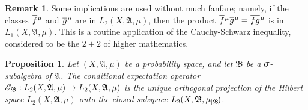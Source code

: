 \documentclass[
twoside=true,
paper=letter,
fontsize=11pt,
pagesize=auto,
leqno,
openany,
headsepline,
overfullrule,
]{scrbook}
\theoremstyle{plain}
\theoremstyle{plain}
\newtheorem{prop}[thm]{Proposition}
\theoremstyle{definition}
\newtheorem{rmk}[thm]{Remark}
\theoremstyle{bfnoteitalic}
\theoremstyle{bfnoteroman}
\newcommand{\sigalg}[1]{\mathfrak{#1}}
\newcommand{\cali}[1]{\mathscr{#1}}
\newcommand{\condexpop}[1]{\mathop{\cali{E}\hspace{-1pt}}\nolimits_{#1}}
\newcommand{\textsigma}{\hbox{\large{$\sigma$}}\kern-1pt}
\newcommand{\restrictedto}[1]{_{\lvert#1}\kern-1.5pt}
\newcommand{\sigmaalgebra}{\sigalg{A}}
\newcommand{\sigmaalgebraii}{\sigalg{B}}
\newcommand{\function}{f}
\newcommand{\functionii}{g}
\newcommand{\measurespace}{X}
\newcommand{\measure}{\mu}
\newcommand*\xbar[1]{%
   \hbox{%
     \vbox{%
       \hrule height 0.4pt %
       \kern0.4ex%
       \hbox{%
         \ensuremath{#1}%
       }%
     }%
   }%
}
\newcommand{\lebclass}[1]{\hspace{.5pt}\xbar{#1}\hspace{0.5pt}}
\newcommand{\ellclass}[2]{\lebclass{#1}^{#2}}
\begin{document}
\begin{rmk}
Some implications are used without much fanfare; namely, if the classes $\ellclass{\function}{\measure}$ and 
$\ellclass{\functionii}{\measure}$ are in 
$L_2(\measurespace, \sigmaalgebra,\measure)$, then the product 
$\ellclass{\function}{\measure}\ellclass{\functionii}{\measure} 
= \ellclass{\function\functionii}{\measure}$ is in 
$L_1(\measurespace, \sigmaalgebra,\measure)$. This is a routine application of the Cauchy-Schwarz inequality, considered to be the $2+2$ of higher mathematics.
\end{rmk}




\begin{prop}\label{projection_proposition}
Let $(\measurespace, \sigmaalgebra,\measure)$ be a  probability space, and let 
$\sigmaalgebraii$ be a $\textsigma$-subalgebra of $\sigmaalgebra$.
The conditional expectation operator 
$
\condexpop{\sigmaalgebraii}:
L_2(\measurespace, \sigmaalgebra,\measure)\to
L_2(\measurespace, \sigmaalgebra,\measure)
$ 
is  the unique orthogonal projection of the Hilbert space $L_2(\measurespace, \sigmaalgebra,\measure)$ onto the closed subspace $L_2(\measurespace, \sigmaalgebraii,\measure\restrictedto{\sigmaalgebraii})$.
\end{prop}
\end{document}
